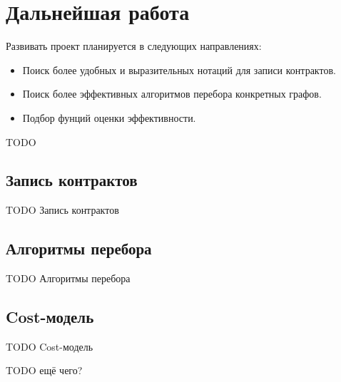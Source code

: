 \section{Дальнейшая работа}

Развивать проект планируется в следующих направлениях:
\begin{itemize}
    \item Поиск более удобных и выразительных нотаций для записи контрактов.
    \item Поиск более эффективных алгоритмов перебора конкретных графов.
    \item Подбор фунций оценки эффективности.
\end{itemize}

TODO

\subsection{Запись контрактов}

TODO Запись контрактов

\subsection{Алгоритмы перебора}

TODO Алгоритмы перебора

\subsection{Cost-модель}

TODO Cost-модель

TODO ещё чего?
